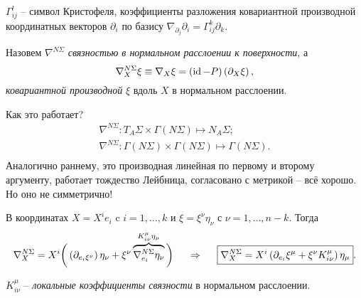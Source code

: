 \begin{to_def} 
    $\Gamma_{ij}^{l}$  -- символ Кристофеля, коэффициенты разложения ковариантной производной координатных векторов 
    $\partial_i$ по базису $\nabla_{\partial_j} \partial_i = \Gamma_{ij}^{k} \partial_k$.
\end{to_def}







\begin{to_def} 
    Назовем $\nabla^{N\Sigma}$ \textit{связностью в нормальном расслоении к поверхности}, а
    \begin{equation}
         \nabla_X^{N\Sigma} \xi \equiv \nabla_X \xi = \left(\mathop{\mathrm{id}}\nolimits - P\right) \left(\partial_X \xi\right),
     \end{equation} 
     \textit{ковариантной производной} $\xi$ вдоль $X$ в нормальном расслоении.
\end{to_def}

Как это работает?
\begin{align*}
    \nabla^{N\Sigma} \colon T_A \Sigma \times \Gamma (N \Sigma) \mapsto N_A \Sigma; \\
    \nabla^{N\Sigma} \colon  \Gamma (N \Sigma) \times \Gamma (N \Sigma) \mapsto  \Gamma (N \Sigma). \\
\end{align*}
Аналогично раннему, это производная линейная по первому и второму аргументу, работает тождество Лейбница, согласовано с метрикой -- всё хорошо.  Но оно не симметрично!


В координатах $X = X^i e_i$ c $i = 1, \ldots, k$ и $\xi = \xi^\nu \eta_\nu$ с $\nu = 1, \ldots, n-k$. Тогда
\begin{equation*}
    \nabla_X^{N\Sigma} = X^i \bigg( 
        \left(\partial_{e_i \xi^\nu}\right) \eta_\nu + \xi^\nu 
        \overbrace{\nabla_{e_i}^{N \Sigma} \eta_\nu}^{K^\mu_{i\nu}\eta_\mu}
    \bigg) 
    \hspace{0.5cm} \Rightarrow \hspace{0.5cm} 
    \boxed{
        \nabla_X^{N\Sigma} = X^i \left(
            \partial_{e_i} \xi^\mu + \xi^\nu K^\mu_{i\nu}
        \right) \eta_\mu
    }.
\end{equation*}

\begin{to_def} 
    $K^\mu_{i\nu}$ -- \textit{локальные коэффициенты связности} в нормальном расслоении.
\end{to_def}





